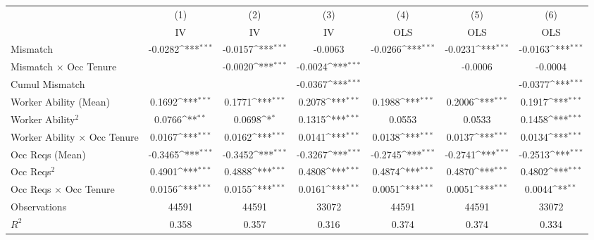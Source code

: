 {
\def\sym#1{\ifmmode^{#1}\else\(^{#1}\)\fi}
\begin{tabular}{l*{6}{c}}
\hline  
                    &\multicolumn{1}{c}{(1)}&\multicolumn{1}{c}{(2)}&\multicolumn{1}{c}{(3)}&\multicolumn{1}{c}{(4)}&\multicolumn{1}{c}{(5)}&\multicolumn{1}{c}{(6)}\\
                    &\multicolumn{1}{c}{IV}&\multicolumn{1}{c}{IV}&\multicolumn{1}{c}{IV}&\multicolumn{1}{c}{OLS}&\multicolumn{1}{c}{OLS}&\multicolumn{1}{c}{OLS}\\
\hline  
Mismatch            &     -0.0282\sym{***}&     -0.0157\sym{***}&     -0.0063         &     -0.0266\sym{***}&     -0.0231\sym{***}&     -0.0163\sym{***}\\
[1em]
Mismatch $\times$ Occ Tenure&                     &     -0.0020\sym{***}&     -0.0024\sym{***}&                     &     -0.0006         &     -0.0004         \\
[1em]
Cumul Mismatch      &                     &                     &     -0.0367\sym{***}&                     &                     &     -0.0377\sym{***}\\
[1em]
Worker Ability (Mean)&      0.1692\sym{***}&      0.1771\sym{***}&      0.2078\sym{***}&      0.1988\sym{***}&      0.2006\sym{***}&      0.1917\sym{***}\\
[1em]
Worker Ability$^2$  &      0.0766\sym{**} &      0.0698\sym{*}  &      0.1315\sym{***}&      0.0553         &      0.0533         &      0.1458\sym{***}\\
[1em]
Worker Ability $\times$ Occ Tenure&      0.0167\sym{***}&      0.0162\sym{***}&      0.0141\sym{***}&      0.0138\sym{***}&      0.0137\sym{***}&      0.0134\sym{***}\\
[1em]
Occ Reqs (Mean)     &     -0.3465\sym{***}&     -0.3452\sym{***}&     -0.3267\sym{***}&     -0.2745\sym{***}&     -0.2741\sym{***}&     -0.2513\sym{***}\\
[1em]
Occ Reqs$^2$        &      0.4901\sym{***}&      0.4888\sym{***}&      0.4808\sym{***}&      0.4874\sym{***}&      0.4870\sym{***}&      0.4802\sym{***}\\
[1em]
Occ Reqs $\times$ Occ Tenure&      0.0156\sym{***}&      0.0155\sym{***}&      0.0161\sym{***}&      0.0051\sym{***}&      0.0051\sym{***}&      0.0044\sym{**} \\
\hline  
Observations        &       44591         &       44591         &       33072         &       44591         &       44591         &       33072         \\
\(R^{2}\)           &       0.358         &       0.357         &       0.316         &       0.374         &       0.374         &       0.334         \\
\hline  
\end{tabular}
}
